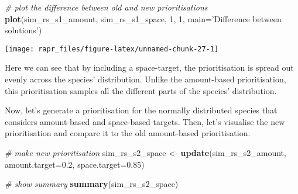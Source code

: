 \documentclass[11pt,]{article}
\newenvironment{Shaded}{\begin{snugshade}}{\end{snugshade}}
\newcommand{\KeywordTok}[1]{\textcolor[rgb]{0.13,0.29,0.53}{\textbf{{#1}}}}
\newcommand{\DataTypeTok}[1]{\textcolor[rgb]{0.13,0.29,0.53}{{#1}}}
\newcommand{\DecValTok}[1]{\textcolor[rgb]{0.00,0.00,0.81}{{#1}}}
\newcommand{\FloatTok}[1]{\textcolor[rgb]{0.00,0.00,0.81}{{#1}}}
\newcommand{\StringTok}[1]{\textcolor[rgb]{0.31,0.60,0.02}{{#1}}}
\newcommand{\CommentTok}[1]{\textcolor[rgb]{0.56,0.35,0.01}{\textit{{#1}}}}
\newcommand{\NormalTok}[1]{{#1}}
\let\origfigure\figure
\let\endorigfigure\endfigure
\renewenvironment{figure}[1][2] {
	\expandafter\origfigure\expandafter[H]
} {
	\endorigfigure
}
\begin{document}
\begin{Shaded}
\begin{Highlighting}[]
\CommentTok{# plot the difference between old and new prioritisations}
\KeywordTok{plot}\NormalTok{(sim_rs_s1_amount, sim_rs_s1_space, }\DecValTok{1}\NormalTok{, }\DecValTok{1}\NormalTok{, }\DataTypeTok{main=}\StringTok{'Difference between solutions'}\NormalTok{)}
\end{Highlighting}
\end{Shaded}

\begin{figure}

{\centering \texttt{[image: rapr\_files/figure-latex/unnamed-chunk-27-1]} 

}

\caption{Difference between two prioritisations for the uniformly distributed species. Prioritisation $X$ was generated using just amount-based targets (20\%), and prioritisation $Y$ was generated using an additional space-based target (85\%).}\label{fig:unnamed-chunk-27}
\end{figure}

Here we can see that by including a space-target, the prioritisation is
spread out evenly across the species' distribution. Unlike the
amount-based prioritisation, this prioritisation samples all the
different parts of the species' distribution.

Now, let's generate a prioritisation for the normally distributed
species that considers amount-based and space-based targets. Then, let's
visualise the new prioritisation and compare it to the old amount-based
prioritisation.

\begin{Shaded}
\begin{Highlighting}[]
\CommentTok{# make new prioritisation}
\NormalTok{sim_rs_s2_space <-}\StringTok{ }\KeywordTok{update}\NormalTok{(sim_rs_s2_amount, }\DataTypeTok{amount.target=}\FloatTok{0.2}\NormalTok{, }\DataTypeTok{space.target=}\FloatTok{0.85}\NormalTok{)}
\end{Highlighting}
\end{Shaded}

\begin{Shaded}
\begin{Highlighting}[]
\CommentTok{# show summary}
\KeywordTok{summary}\NormalTok{(sim_rs_s2_space)}
\end{Highlighting}
\end{Shaded}
\end{document}
